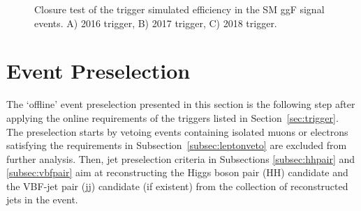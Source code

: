 \begin{figure}[htp!]%
\centering
\captionsetup[subfigure]{justification=centering}
\caption[Closure test of the trigger simulated efficiency in the SM ggF signal events]{Closure test of the trigger simulated efficiency in the SM ggF signal events. A) 2016 trigger, B) 2017 trigger, C) 2018 trigger.}
\label{fig:triggermcclosure}
\end{figure}

\clearpage %
\section{Event Preselection} \label{sec:preselection}
The `offline' event preselection presented in this section is the following step after applying the online requirements of the triggers listed in Section~\ref{sec:trigger}. The preselection starts by vetoing events containing isolated muons or electrons satisfying the requirements in Subsection~\ref{subsec:leptonveto} are excluded from further analysis. Then, jet preselection criteria in Subsections \ref{subsec:hhpair} and \ref{subsec:vbfpair} aim at reconstructing the Higgs boson pair (HH) candidate and the VBF-jet pair (jj) candidate (if existent) from the collection of reconstructed jets in the event.

